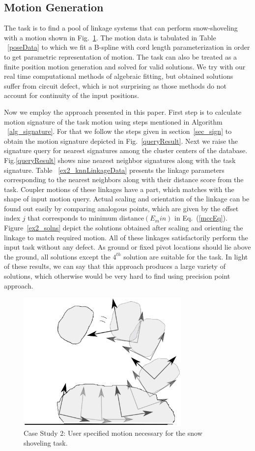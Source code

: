 \documentclass[twocolumn,10pt]{asme2e}
\newcommand{\req}[1]{(\ref{#1})}
\begin{document}
\subsection{Motion Generation}
The task is to find a pool of linkage systems that can perform snow-shoveling with a motion shown in Fig.~\ref{motionQuery}.
The motion data is tabulated in Table ~\ref{poseData} to which we fit a B-spline with cord length parameterization in order to get parametric representation of motion.
The task can also be treated as a finite position motion generation and solved for valid solutions.
We try with our real time computational methods of algebraic fitting\cite{generalfitting-JCISE},\cite{deshpande2017} but obtained solutions suffer from circuit defect, which is not surprising as those methods do not account for continuity of the input positions.

Now we employ the approach presented in this paper.
First step is to calculate motion signature of the task motion using steps mentioned in Algorithm ~\ref{alg_signature}.
For that we follow the steps given in section~\ref{sec_sign} to obtain the motion signature depicted in Fig.~\ref{queryResult}.
Next we raise the signature query for nearest signatures among the cluster centers of the database.
Fig.\ref{queryResult} shows nine nearest neighbor signatures along with the task signature.
Table ~\ref{ex2_knnLinkageData} presents the linkage parameters corresponding to the nearest neighbors along with their distance score from the task.
Coupler motions of these linkages have a part, which matches with the shape of input motion query.
Actual scaling and orientation of the linkage can be found out easily by comparing analogous points, which are given by the offset index $j$ that corresponds to minimum distance$(E_min)$ in Eq.~\req{mccEq}.
Figure~\ref{ex2_solns} depict the solutions obtained after scaling and orienting the linkage to match required motion.
All of these linkages satisfactorily perform the input task without any defect.
As ground or fixed pivot locations should lie above the ground, all solutions except the $4^{th}$ solution are suitable for the task.
In light of these results, we can say that this approach produces a large variety of solutions, which otherwise would be very hard to find using precision point approach.

\begin{figure}
\centering
\includegraphics[width=240pt]{figure/fig_motion_query.eps}
  \caption{Case Study 2: User specified motion necessary for the snow shoveling task.}
\label{motionQuery}
\end{figure}
\end{document}
